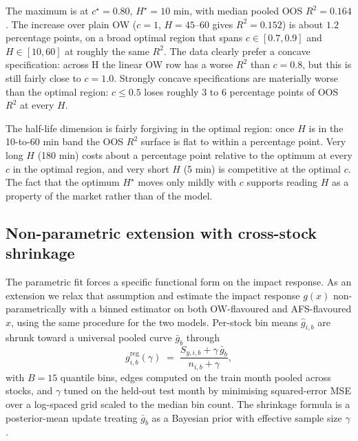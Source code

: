 \documentclass[11pt,a4paper]{article}
\begin{document}
The maximum is at $c^\star = 0.80$, $H^\star = 10$ min, with median
pooled OOS $R^2 = 0.164$.  The increase over plain OW ($c = 1$,
$H = 45\text{--}60$ gives $R^2 = 0.152$) is about $1.2$ percentage
points, on a broad optimal region that spans $c \in [0.7, 0.9]$ and
$H \in [10, 60]$ at roughly the same $R^2$.  The data clearly prefer a
concave specification: across H the linear OW row has a worse $R^2$ than $c=0.8$, but this is still fairly close to $c=1.0$. Strongly concave
specifications are materially worse than the optimal region: $c \le 0.5$ loses
roughly $3$ to $6$ percentage points of OOS $R^2$ at every $H$.

The half-life dimension is fairly forgiving in the optimal region: once
$H$ is in the 10-to-60 min band the OOS $R^2$ surface is flat to
within a percentage point.  Very long $H$ (180 min) costs about a
percentage point relative to the optimum at every $c$ in the optimal region,
and very short $H$ (5 min) is competitive at the optimal $c$.  The
fact that the optimum $H^\star$ moves only mildly with $c$ supports
reading $H$ as a property of the market rather than of the model.

\bigskip
\noindent
{}
\bigskip


\subsection{Non-parametric extension with cross-stock shrinkage}\label{sec:np}

The parametric fit forces a specific functional form on the impact
response.  As an extension we relax that assumption and estimate the
impact response $g(x)$ non-parametrically with a binned estimator on
both OW-flavoured and AFS-flavoured $x$, using the same procedure for
the two models.  Per-stock bin means $\hat g_{i,b}$ are shrunk toward
a universal pooled curve $\bar g_b$ through
\[
  g_{i,b}^{\mathrm{reg}}(\gamma)
    \;=\; \frac{S_{y,i,b} + \gamma\,\bar g_b}{n_{i,b}+\gamma},
\]
with $B = 15$ quantile bins, edges computed on the train month pooled
across stocks, and $\gamma$ tuned on the held-out test month by
minimising squared-error MSE over a log-spaced grid scaled to the
median bin count.  The shrinkage formula is a posterior-mean
update treating $\bar g_b$ as a Bayesian prior with effective sample
size $\gamma$.
\end{document}
